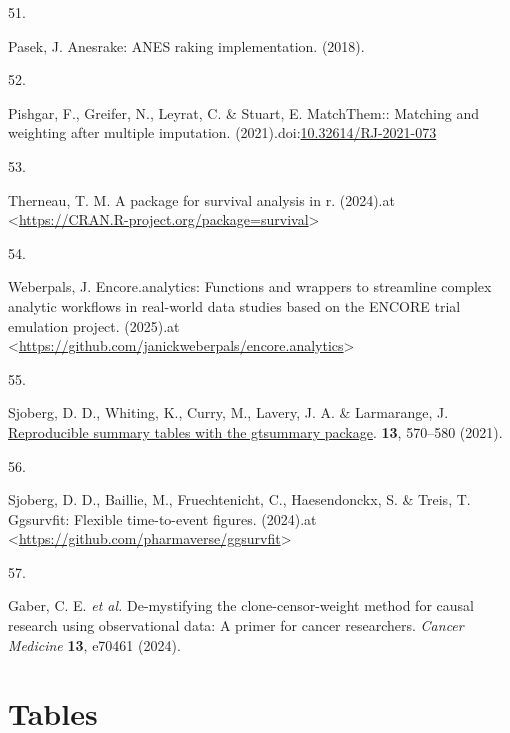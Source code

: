 \documentclass[
  letterpaper,
  DIV=11,
  numbers=noendperiod]{scrartcl}
\newlength{\cslhangindent}
\newlength{\csllabelwidth}
\newenvironment{CSLReferences}[2] %
 {\begin{list}{}{%
  \setlength{\itemindent}{0pt}
  \setlength{\leftmargin}{0pt}
  \setlength{\parsep}{0pt}
  \ifodd #1
   \setlength{\leftmargin}{\cslhangindent}
   \setlength{\itemindent}{-1\cslhangindent}
  \fi
  \setlength{\itemsep}{#2\baselineskip}}}
 {\end{list}}
\newcommand{\CSLLeftMargin}[1]{\parbox[t]{\csllabelwidth}{\strut#1\strut}}
\newcommand{\CSLRightInline}[1]{\parbox[t]{\linewidth - \csllabelwidth}{\strut#1\strut}}
\begin{document}
\begin{CSLReferences}{0}{0}
\CSLLeftMargin{51. }%
\CSLRightInline{Pasek, J. Anesrake: ANES raking implementation. (2018).}

\CSLLeftMargin{52. }%
\CSLRightInline{Pishgar, F., Greifer, N., Leyrat, C. \& Stuart, E.
MatchThem:: Matching and weighting after multiple imputation.
(2021).doi:\href{https://doi.org/10.32614/RJ-2021-073}{10.32614/RJ-2021-073}}

\CSLLeftMargin{53. }%
\CSLRightInline{Therneau, T. M. A package for survival analysis in r.
(2024).at
\textless{}\url{https://CRAN.R-project.org/package=survival}\textgreater{}}

\CSLLeftMargin{54. }%
\CSLRightInline{Weberpals, J. Encore.analytics: Functions and wrappers
to streamline complex analytic workflows in real-world data studies
based on the ENCORE trial emulation project. (2025).at
\textless{}\url{https://github.com/janickweberpals/encore.analytics}\textgreater{}}

\CSLLeftMargin{55. }%
\CSLRightInline{Sjoberg, D. D., Whiting, K., Curry, M., Lavery, J. A. \&
Larmarange, J. \href{https://doi.org/10.32614/RJ-2021-053}{Reproducible
summary tables with the gtsummary package}. \textbf{13}, 570--580
(2021).}

\CSLLeftMargin{56. }%
\CSLRightInline{Sjoberg, D. D., Baillie, M., Fruechtenicht, C.,
Haesendonckx, S. \& Treis, T. Ggsurvfit: Flexible time-to-event figures.
(2024).at
\textless{}\url{https://github.com/pharmaverse/ggsurvfit}\textgreater{}}

\CSLLeftMargin{57. }%
\CSLRightInline{Gaber, C. E. \emph{et al.} De-mystifying the
clone-censor-weight method for causal research using observational data:
A primer for cancer researchers. \emph{Cancer Medicine} \textbf{13},
e70461 (2024).}

\end{CSLReferences}

\newpage{}

\section*{Tables}\label{tables}
\end{document}
